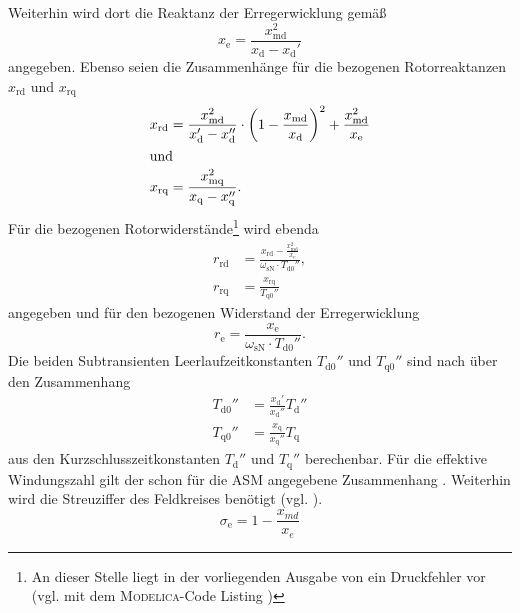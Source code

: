 Weiterhin wird dort die Reaktanz der Erregerwicklung gemäß
\begin{equation}
    x_{\mathrm{e}} = \frac{x_{\mathrm{md}}^2}{x_{\mathrm{d}}-x_{\mathrm{d}}'}
\end{equation}
angegeben. Ebenso seien die Zusammenhänge für die bezogenen Rotorreaktanzen \(x_{\mathrm{rd}}\) und \(x_{\mathrm{rq}}\)
\begin{align}
    x_{\mathrm{rd}} &= \frac{x_{\mathrm{md}}^2}{x_{\mathrm{d}}' - x_{\mathrm{d}}''}\cdot \left( 1-\frac{x_{\mathrm{md}}}{x_{\mathrm{d}}}\right)^2 + \frac{x_{\mathrm{md}}^2}{x_{\mathrm{e}}}\\
    \intertext{und}
    x_{\mathrm{rq}} &= \frac{x_{\mathrm{mq}}^2}{x_{\mathrm{q}} - x_{\mathrm{q}}''}.
\end{align}
Für die bezogenen Rotorwiderstände\footnote{An dieser Stelle liegt in der vorliegenden Ausgabe von \cite[]{kralModelicaObjektorientierteModellbildung2019} ein Druckfehler vor (vgl. mit dem \textsc{Modelica}-Code Listing \cite[S. 266]{kralModelicaObjektorientierteModellbildung2019})} wird ebenda
\begin{align}
    r_{\mathrm{rd}} &= \frac{x_{\mathrm{rd}} - \frac{x_{\mathrm{md}}^2}{x_{\mathrm{e}}}}{\omega_{\mathrm{sN}}\cdot T_{\mathrm{d0}}''}, \\
    r_{\mathrm{rq}} &= \frac{x_{\mathrm{rq}}}{T_{\mathrm{q0}}''}
\end{align}
angegeben und für den bezogenen Widerstand der Erregerwicklung
\begin{equation}
    r_{\mathrm{e}} = \frac{x_{\mathrm{e}}}{\omega_{\mathrm{sN}}\cdot T_{\mathrm{d0}}''}.
\end{equation}
Die beiden Subtransienten Leerlaufzeitkonstanten \(T_{\mathrm{d0}}''\)
und \(T_{\mathrm{q0}}''\) sind nach
\cite[S. 222ff.]{bonfertBetriebsverhaltenSynchronmaschine1962} über den Zusammenhang
\begin{align}
T_{\mathrm{d0}}'' &= \frac{x_{\mathrm{d}}'}{x_{\mathrm{d}}''}T_{\mathrm{d}}'' \\
T_{\mathrm{q0}}'' &= \frac{x_{\mathrm{q}}}{x_{\mathrm{q}}''}T_{\mathrm{q}}
\end{align}
aus den Kurzschlusszeitkonstanten \(T_{\mathrm{d}}''\) und \(T_{\mathrm{q}}''\) berechenbar. Für die effektive Windungszahl gilt der schon für die ASM angegebene Zusammenhang .
Weiterhin wird die Streuziffer des Feldkreises benötigt (vgl. \cite[S.~267]{kralModelicaObjektorientierteModellbildung2019}).
\begin{equation}
	\sigma_\mathrm{e} = 1-\frac{x_{md}}{x_e}
\end{equation}

